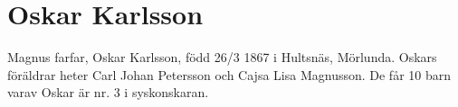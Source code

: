 \chapter{Oskar Karlsson}
\label{oskar_karlsson}
Magnus farfar, Oskar Karlsson, född 26/3 1867 i Hultsnäs, Mörlunda. Oskars föräldrar heter Carl Johan Petersson och Cajsa Lisa Magnusson. De får 10 barn varav Oskar är nr. 3 i syskonskaran.
